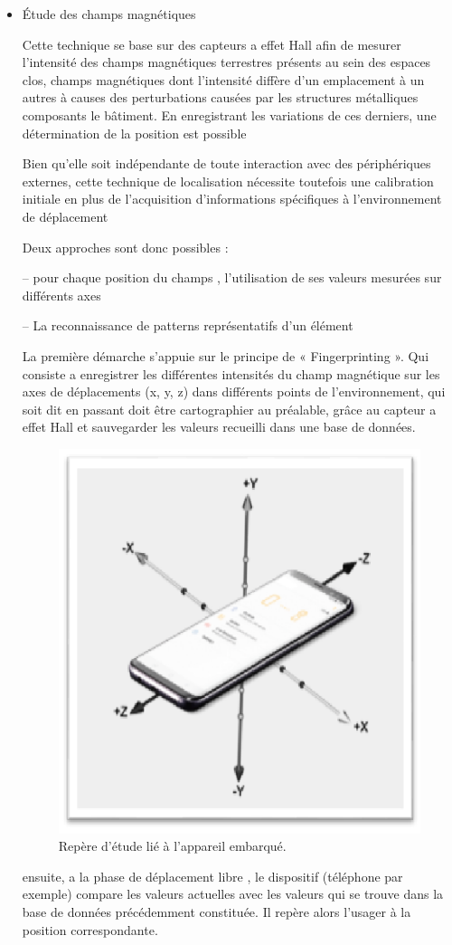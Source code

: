 \documentclass[12pt,a4paper]{report}
\begin{document}
	\begin{itemize}
	\item Étude des champs magnétiques \cite{magnet}
	
	Cette technique se base sur des capteurs a effet Hall afin de mesurer l’intensité des champs magnétiques terrestres présents au sein des espaces clos, champs magnétiques dont l’intensité diffère d’un emplacement à un autres à causes des perturbations causées par les structures métalliques composants le bâtiment. En enregistrant les variations de ces derniers, une détermination de la position est possible
	
	
	Bien qu’elle soit indépendante de toute interaction avec des périphériques externes, cette technique de localisation nécessite toutefois une calibration initiale en plus de l’acquisition d’informations spécifiques à l’environnement de déplacement
	
	Deux approches sont donc possibles :
	
	
	– pour chaque position du champs , l'utilisation de ses valeurs mesurées sur différents axes
	
	– La reconnaissance de patterns représentatifs d’un élément
	
	La première démarche s’appuie sur le principe de « Fingerprinting ». Qui consiste a enregistrer les différentes intensités du champ magnétique sur les axes de déplacements (x, y, z) dans différents points de l’environnement, qui soit dit en passant doit être cartographier au préalable, grâce au capteur a effet Hall et sauvegarder les valeurs recueilli dans une base de données.
	
	\begin{figure}[h]
		\centering
		\includegraphics[width=0.4\linewidth]{Pics/position.png}
		\caption{Repère d’étude lié à l’appareil embarqué.}
		\label{fig:position}
	\end{figure}

ensuite, a la phase de déplacement libre , le dispositif (téléphone par exemple) compare les valeurs actuelles avec les valeurs qui se trouve dans la base de données précédemment constituée. Il repère alors l’usager à la position correspondante.



\end{itemize}
\end{document}

